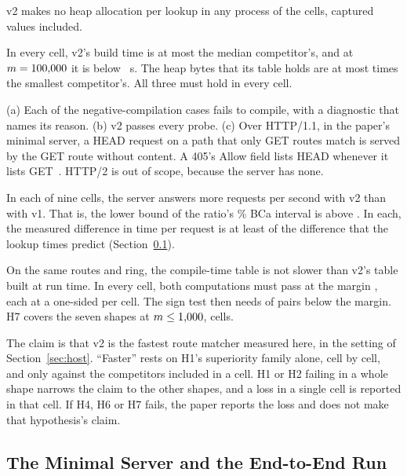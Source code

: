  v2 makes no heap allocation per lookup in any process of the
\HOneCells{} cells, captured values included.

 In every cell, v2's build time is at most the median competitor's,
and at $m=100{,}000$ it is below \BuildLimitSeconds~s. The heap bytes that its table holds
are at most \HeapFactor{} times the smallest competitor's. All three must hold in every cell.

 (a) Each of the \NegCases{}
negative-compilation cases fails to compile, with a diagnostic that names its reason. (b) v2 passes
every probe. (c) Over HTTP/1.1, in the paper's minimal server, a HEAD request on a path that only GET
routes match is served by the GET route without content. A 405's Allow field lists HEAD whenever it
lists GET~\cite{fielding2022rfc9110}. HTTP/2 is out of scope, because the server has none.

 In each of nine cells, the server answers more
requests per second with v2 than with v1. That is, the lower bound of the ratio's \Level\% BCa
interval is above \SupMargin. In each, the measured difference in time per request is at least \CarryBound{} of
the difference that the lookup times predict (Section~\ref{sec:server}).

 On the same routes and ring, the
compile-time table is not slower than v2's table built at run time. In every cell, both computations
must pass at the margin \Margin, each at a one-sided \Alpha{} per cell. The sign test then needs
\HSevenSignNeed{} of \RoundTwoReps{} pairs below the margin. H7 covers the seven shapes at $m\leq
1{,}000$, \HSevenCells{} cells.

 The claim is that v2 is the fastest route matcher
measured here, in the setting of Section~\ref{sec:host}. ``Faster'' rests on H1's superiority family
alone, cell by cell, and only against the competitors included in a cell. H1 or H2 failing in a whole
shape narrows the claim to the other shapes, and a loss in a single cell is reported in that cell.
If H4, H6 or H7 fails, the paper reports the loss and does not make that hypothesis's claim.

\subsection{The Minimal Server and the End-to-End Run}\label{sec:server}

